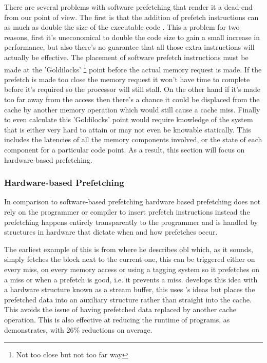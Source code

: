 There are several problems with software prefetching that render it a dead-end from our point of view. The first is that the addition of prefetch instructions can as much as double the size of the executable code \cite{leeWhenPrefetchingWorks2012}. This a problem for two reasons, first it's uneconomical to double the code size to gain a small increase in performance, but also there's no guarantee that all those extra instructions will actually be effective. The placement of software prefetch instructions must be made at the 'Goldilocks' \footnote{Not too close but not too far way} point before the actual memory request is made. If the prefetch is made too close the memory request it won't have time to complete before it's required so the processor will still stall. On the other hand if it's made too far away from the access then there's a chance it could be displaced from the cache by another memory operation which would still cause a cache miss. Finally to even calculate this 'Goldilocks' point would require knowledge of the system that is either very hard to attain or may not even be knowable statically. This includes the latencies of all the memory components involved, or the state of each component for a particular code point. As a result, this section will focus on hardware-based prefetching.

\subsubsection{Hardware-based Prefetching}

In comparison to software-based prefetching hardware based prefetching does not rely on the programmer or compiler to insert prefetch instructions instead the prefetching happens entirely transparently to the programmer and is handled by structures in hardware that dictate when and how prefetches occur. 

The earliest example of this is from \citet{smithCacheMemories1982} where he describes \gls{obl} which, as it sounds, simply fetches the block next to the current one, this can be triggered either on every miss, on every memory access or using a tagging system so it prefetches on a miss or when a prefetch is good, i.e. it prevents a miss. \citet{jouppiImprovingDirectmappedCache1990} develops this idea with a hardware structure known as a stream buffer, this uses \citeauthor{smithCacheMemories1982}'s ideas but places the prefetched data into an auxiliary structure rather than straight into the cache. This avoids the issue of having prefetched data replaced by another cache operation. This is also effective at reducing the runtime of programs, as \citet{farkasHowUsefulAre1995} demonstrates, with 26\% reductions on average.

